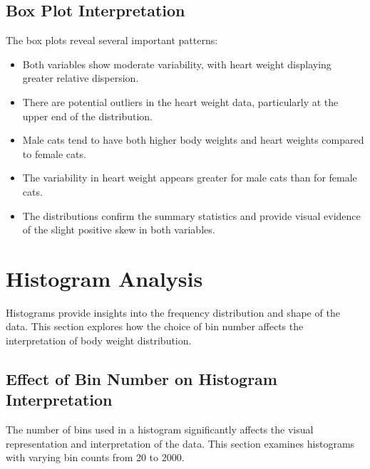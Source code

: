 \documentclass[a4paper,12pt]{article}
\begin{document}
\subsection{Box Plot Interpretation}
\label{subsec:bp_interpretation}

The box plots reveal several important patterns:

\begin{itemize}[leftmargin=1.5cm]
    \item Both variables show moderate variability, with heart weight displaying greater relative dispersion.
    \item There are potential outliers in the heart weight data, particularly at the upper end of the distribution.
    \item Male cats tend to have both higher body weights and heart weights compared to female cats.
    \item The variability in heart weight appears greater for male cats than for female cats.
    \item The distributions confirm the summary statistics and provide visual evidence of the slight positive skew in both variables.
\end{itemize}

\section{Histogram Analysis}
\label{sec:histograms}

Histograms provide insights into the frequency distribution and shape of the data. This section explores how the choice of bin number affects the interpretation of body weight distribution.

\subsection{Effect of Bin Number on Histogram Interpretation}
\label{subsec:bin_effect}

The number of bins used in a histogram significantly affects the visual representation and interpretation of the data. This section examines histograms with varying bin counts from 20 to 2000.
\end{document}
